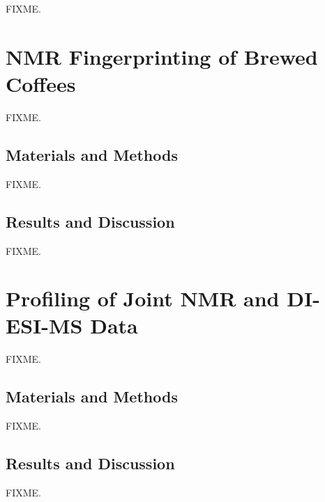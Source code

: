 \begin{doublespace}
FIXME.
\end{doublespace}

\section{\hnmr{} NMR Fingerprinting of Brewed Coffees}

\begin{doublespace}
FIXME.
\end{doublespace}

\subsection{Materials and Methods}

\begin{doublespace}
FIXME.
\end{doublespace}

\subsection{Results and Discussion}

\begin{doublespace}
FIXME.
\end{doublespace}

\section{Profiling of Joint \hnmr{} NMR and DI-ESI-MS Data}

\begin{doublespace}
FIXME.
\end{doublespace}

\subsection{Materials and Methods}

\begin{doublespace}
FIXME.
\end{doublespace}

\subsection{Results and Discussion}

\begin{doublespace}
FIXME.
\end{doublespace}

